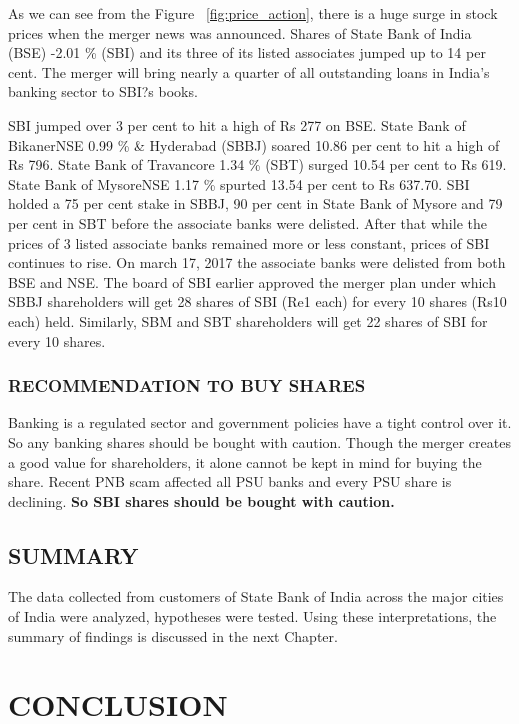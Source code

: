\documentclass[a4paper, 12pt]{extarticle}
\begin{document}
{\par As we can see from the Figure ~\ref{fig:price_action}, there is a huge surge in stock prices when the merger news was announced. Shares of State Bank of India (BSE) -2.01 \% (SBI) and its three of its listed associates jumped up to 14 per cent. The merger will bring nearly a quarter of all outstanding loans in India's banking sector to SBI?s books.

SBI jumped over 3 per cent to hit a high of Rs 277 on BSE. State Bank of BikanerNSE 0.99 \% \& Hyderabad (SBBJ) soared 10.86 per cent to hit a high of Rs 796. State Bank of Travancore 1.34 \% (SBT) surged 10.54 per cent to Rs 619. State Bank of MysoreNSE 1.17 \% spurted 13.54 per cent to Rs 637.70. SBI holded a 75 per cent stake in SBBJ, 90 per cent in State Bank of Mysore and 79 per cent in SBT before the associate banks were delisted. After that while the prices of 3 listed associate banks remained more or less constant, prices of SBI continues to rise. On march 17, 2017 the associate banks were delisted from both BSE and NSE. The board of SBI earlier approved the merger plan under which SBBJ shareholders will get 28 shares of SBI (Re1 each) for every 10 shares (Rs10 each) held. Similarly, SBM and SBT shareholders will get 22 shares of SBI for every 10 shares.

\subsubsection{RECOMMENDATION TO BUY SHARES}
\par Banking is a regulated sector and government policies have a tight control over it. So any banking shares should be bought with caution. Though the merger creates a good value for shareholders, it alone cannot be kept in mind for buying the share. Recent PNB scam affected all PSU banks and every PSU share is declining. \textbf{So SBI shares should be bought with caution.}

\subsection{SUMMARY}

The data collected from customers of State Bank of India across the major cities of India were analyzed, hypotheses were tested. Using these interpretations, the summary of findings is discussed in the next Chapter.

\newpage
\section{CONCLUSION}
}
\end{document}
